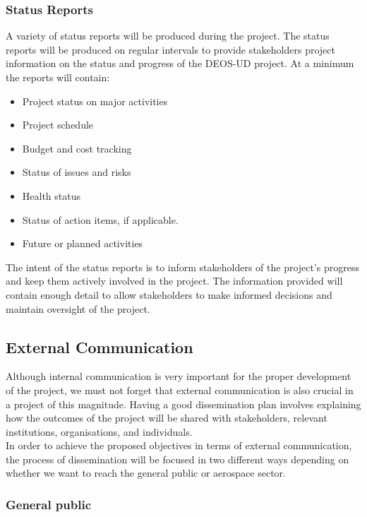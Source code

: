 \subsubsection{Status Reports}

A variety of status reports will be produced during the project. The status reports will be produced on regular intervals to provide stakeholders project information on the status and progress of the DEOS-UD project. At a minimum the reports will contain:
 \begin{itemize}
	\item Project status on major activities
	\item Project schedule
	\item Budget and cost tracking
	\item Status of issues and risks
	\item Health status	
	\item Status of action items, if applicable.
	\item Future or planned activities 
 \end{itemize}

The intent of the status reports is to inform stakeholders of the project’s progress and keep them actively involved in the project. The information provided will contain enough detail to allow stakeholders to make informed decisions and maintain oversight of the project.

\subsection{External Communication}

Although internal communication is very important for the proper development of the project, we must not forget that external communication is also crucial in a project of this magnitude. Having a good dissemination plan involves explaining how the outcomes of the project will be shared with stakeholders, relevant institutions, organisations, and individuals. \\
In order to achieve the proposed objectives in terms of external communication, the process of dissemination will be focused  in two different ways depending on whether we want to reach the general public or aerospace sector.

\subsubsection{General public}

